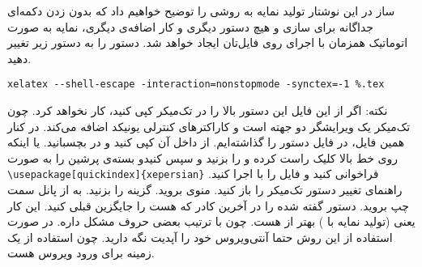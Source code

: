 \documentclass[a4paper]{article}
\begin{document}
\date{}
‌ساز
در این نوشتار  تولید نمایه به روشی را توضیح خواهیم داد که بدون زدن دکمه‌‌ای جداگانه برای سازی و هیچ دستور دیگری و کار اضافه‌ی دیگری، نمایه به صورت اتوماتیک همزمان با اجرای \XeLaTeX روی فایل‌تان ایجاد خواهد شد.
دستور   را به دستور زیر تغییر دهید.
\begin{LTR}\begin{verbatim}
xelatex --shell-escape -interaction=nonstopmode -synctex=-1 %.tex
\end{verbatim}\end{LTR}
نکته: اگر از این فایل  این دستور بالا را در تک‌میکر کپی کنید، کار نخواهد کرد. چون تک‌میکر یک ویرایشگر دو جهته است و کاراکترهای کنترلی یونیکد اضافه می‌کند. در کنار همین فایل، در فایل  دستور را گذاشته‌ایم. از داخل آن کپی کنید و در  بچسبانید. یا اینکه روی خط بالا کلیک راست کرده و  را بزنید و سپس  کنیدو
بسته‌ی ‌پرشین را به صورت 
\verb|\usepackage[quickindex]{xepersian}|
 فراخوانی کنید و فایل را با \XeLaTeX اجرا کنید.
راهنمای تغییر دستور 
 تک‌میکر را باز کنید. 
 منوی  بروید. 
 گزینه   را بزنید. 
 به   از پانل سمت چپ بروید. 
 دستور گفته شده را در آخرین کادر که   هست را جایگزین قبلی کنید.
این کار یعنی (تولید نمایه با ) بهتر از  هست. چون  با ترتیب بعضی حروف مشکل داره.
در صورت استفاده از این روش حتما آنتی‌ویروس خود را آپدیت نگه دارید. چون  استفاده از  یک زمینه برای ورود ویروس هست.




\printindex
\end{document}
